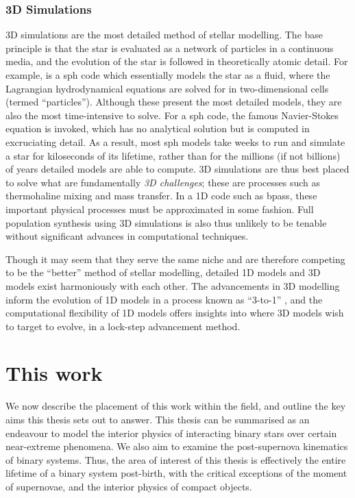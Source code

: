 \subsubsection{3D Simulations}

3D simulations are the most detailed method of stellar modelling. The base principle is that the star is evaluated as a network of particles in a continuous media, and the evolution of the star is followed in theoretically atomic detail. For example,  \citep{Price:2018} is a \gls{sph} code which essentially models the star as a fluid, where the Lagrangian hydrodynamical equations are solved for in two-dimensional cells (termed ``particles''). Although these present the most detailed models, they are also the most time-intensive to solve. For a \gls{sph} code, the famous Navier-Stokes equation is invoked, which has no analytical solution but is computed in excruciating detail. As a result, most \gls{sph} models take weeks to run and simulate a star for kiloseconds of its lifetime, rather than for the millions (if not billions) of years detailed models are able to compute. 3D simulations are thus best placed to solve what are fundamentally \textit{3D challenges}; these are processes such as thermohaline mixing and mass transfer. In a 1D code such as \gls{bpass}, these important physical processes must be approximated in some fashion. Full population synthesis using 3D simulations is also thus unlikely to be tenable without significant advances in computational techniques.

Though it may seem that they serve the same niche and are therefore competing to be the ``better'' method of stellar modelling, detailed 1D models and 3D models exist harmoniously with each other. The advancements in 3D modelling inform the evolution of 1D models in a process known as ``3-to-1'' \citep{Rizzuti:2023, Rizzuti:2024}, and the computational flexibility of 1D models offers insights into where 3D models wish to target to evolve, in a lock-step advancement method.

\section{This work}

We now describe the placement of this work within the field, and outline the key aims this thesis sets out to answer. This thesis can be summarised as an endeavour to model the interior physics of interacting binary stars over certain near-extreme phenomena. We also aim to examine the post-supernova kinematics of binary systems. Thus, the area of interest of this thesis is effectively the entire lifetime of a binary system post-birth, with the critical exceptions of the moment of supernovae, and the interior physics of compact objects.

